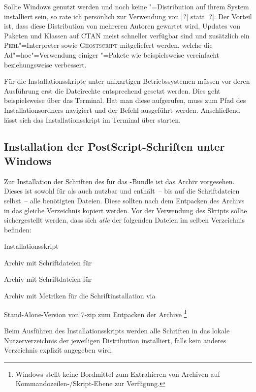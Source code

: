 Sollte Windows genutzt werden und noch keine "=Distribution auf 
ihrem System installiert sein, so rate ich persönlich zur Verwendung von 
|?| statt |?|. 
Der Vorteil ist, dass diese Distribution von mehreren Autoren gewartet wird, 
Updates von Paketen und Klassen auf CTAN meist schneller verfügbar sind und 
zusätzlich ein \textsc{Perl}"=Interpreter sowie \textsc{Ghostscript} 
mitgeliefert werden, welche die Ad"=hoc"=Verwendung einiger 
"=Pakete wie beispielsweise  vereinfacht 
beziehungsweise verbessert.

Für die Installationsskripte unter unixartigen Betriebssystemen müssen vor 
deren Ausführung erst die Dateirechte entsprechend gesetzt werden. Dies geht 
beispielsweise über das Terminal. Hat man diese aufgerufen, muss zum Pfad des 
Installationsordners navigiert und der Befehl 
ausgeführt werden. Anschließend lässt sich das Installationsskript im Terminal
über  starten.


\subsection{Installation der PostScript-Schriften unter Windows}
\label{sec:install:fonts:win}
Zur Installation der Schriften des \CDs für das \TUDScript-Bundle ist das Archiv
%
{} vorgesehen. Dieses ist sowohl für 
 als auch  
nutzbar und enthält~-- bis auf die Schriftdateien selbst~-- alle benötigten 
Dateien. Diese sollten nach dem Entpacken des Archivs in das gleiche 
Verzeichnis kopiert werden. Vor der Verwendung des Skripts 
 sollte sichergestellt werden, dass sich 
\emph{alle} der folgenden Dateien im selben Verzeichnis befinden:
%
%
\begin{description}[labelwidth=\tempdim,labelsep=1em]
  \item[\File{tudscrfonts\_install.bat}]Installationsskript
  \item[\File{Univers\_PS.zip}]Archiv mit Schriftdateien für \Univers
  \item[\File{DIN\_Bd\_PS.zip}]Archiv mit Schriftdateien für \DIN
  \item[\File{tudscrfonts.zip}]Archiv mit Metriken für die
    Schriftinstallation via 
  \item[\File{7za.exe}]Stand-Alone-Version von 7-zip zum Entpacken der Archive%
    \footnote{%
      Windows stellt keine Bordmittel zum Extrahieren von Archiven auf 
      Kommandozeilen-/Skript-Ebene zur Verfügung.%
    }%
\end{description}
%
Beim Ausführen des Installationsskripts werden alle Schriften in das lokale 
Nutzerverzeichnis der jeweiligen Distribution installiert, falls kein anderes 
Verzeichnis explizit angegeben wird.

